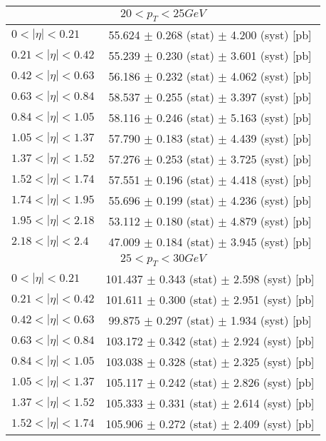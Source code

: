 \begin{tabular}{lc}
\hline
\multicolumn{2}{c}{$20 < p_{T} < 25 GeV$} \\
\hline
$0 < |\eta| <0.21$             & 55.624 $\pm$ 0.268 (stat) $\pm$ 4.200 (syst) [pb]  \\
$0.21 < |\eta| <0.42$          & 55.239 $\pm$ 0.230 (stat) $\pm$ 3.601 (syst) [pb]  \\
$0.42 < |\eta| <0.63$          & 56.186 $\pm$ 0.232 (stat) $\pm$ 4.062 (syst) [pb]  \\
$0.63 < |\eta| <0.84$          & 58.537 $\pm$ 0.255 (stat) $\pm$ 3.397 (syst) [pb]  \\
$0.84 < |\eta| <1.05$          & 58.116 $\pm$ 0.246 (stat) $\pm$ 5.163 (syst) [pb]  \\
$1.05 < |\eta| <1.37$          & 57.790 $\pm$ 0.183 (stat) $\pm$ 4.439 (syst) [pb]  \\
$1.37 < |\eta| <1.52$          & 57.276 $\pm$ 0.253 (stat) $\pm$ 3.725 (syst) [pb]  \\
$1.52 < |\eta| <1.74$          & 57.551 $\pm$ 0.196 (stat) $\pm$ 4.418 (syst) [pb]  \\
$1.74 < |\eta| <1.95$          & 55.696 $\pm$ 0.199 (stat) $\pm$ 4.236 (syst) [pb]  \\
$1.95 < |\eta| <2.18$          & 53.112 $\pm$ 0.180 (stat) $\pm$ 4.879 (syst) [pb]  \\
$2.18 < |\eta| <2.4$           & 47.009 $\pm$ 0.184 (stat) $\pm$ 3.945 (syst) [pb]  \\
\hline
\multicolumn{2}{c}{$25 < p_{T} < 30 GeV$} \\
\hline
$0 < |\eta| <0.21$             & 101.437 $\pm$ 0.343 (stat) $\pm$ 2.598 (syst) [pb]  \\
$0.21 < |\eta| <0.42$          & 101.611 $\pm$ 0.300 (stat) $\pm$ 2.951 (syst) [pb]  \\
$0.42 < |\eta| <0.63$          & 99.875 $\pm$ 0.297 (stat) $\pm$ 1.934 (syst) [pb]  \\
$0.63 < |\eta| <0.84$          & 103.172 $\pm$ 0.342 (stat) $\pm$ 2.924 (syst) [pb]  \\
$0.84 < |\eta| <1.05$          & 103.038 $\pm$ 0.328 (stat) $\pm$ 2.325 (syst) [pb]  \\
$1.05 < |\eta| <1.37$          & 105.117 $\pm$ 0.242 (stat) $\pm$ 2.826 (syst) [pb]  \\
$1.37 < |\eta| <1.52$          & 105.333 $\pm$ 0.331 (stat) $\pm$ 2.614 (syst) [pb]  \\
$1.52 < |\eta| <1.74$          & 105.906 $\pm$ 0.272 (stat) $\pm$ 2.409 (syst) [pb]  \\

\end{tabular}
